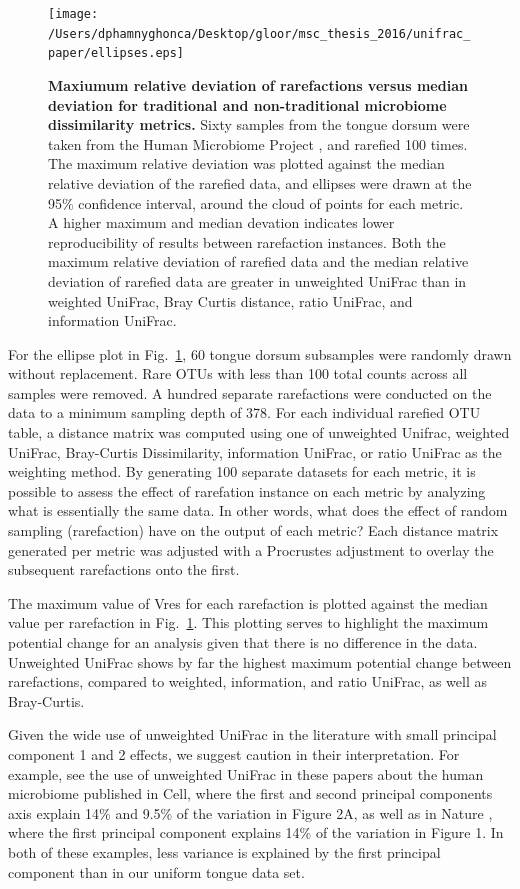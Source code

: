 \documentclass[10pt,letterpaper]{article}
\begin{document}
\begin{figure}[h]
\texttt{[image: /Users/dphamnyghonca/Desktop/gloor/msc\_thesis\_2016/unifrac\_paper/ellipses.eps]}
\caption{{\bf Maxiumum relative deviation of rarefactions versus median deviation for traditional and non-traditional microbiome dissimilarity metrics.} Sixty samples from the tongue dorsum were taken from the Human Microbiome Project \cite{turnbaugh2007human}, and rarefied 100 times. The maximum relative deviation was plotted against the median relative deviation of the rarefied data, and ellipses were drawn at the 95\% confidence interval, around the cloud of points for each metric. A higher maximum and median devation indicates lower reproducibility of results between rarefaction instances. Both the maximum relative deviation of rarefied data and the median relative deviation of rarefied data are greater in unweighted UniFrac than in weighted UniFrac, Bray Curtis distance, ratio UniFrac, and information UniFrac.}
\label{fig3}
\end{figure}

For the ellipse plot in Fig.~\ref{fig3}, 60 tongue dorsum subsamples were randomly drawn without replacement. Rare OTUs with less than 100 total counts across all samples were removed. A hundred separate rarefactions were conducted on the data to a minimum sampling depth of 378. For each individual rarefied OTU table, a distance matrix was computed using one of unweighted Unifrac, weighted UniFrac, Bray-Curtis Dissimilarity, information UniFrac, or ratio UniFrac as the weighting method. By generating 100 separate datasets for each metric, it is possible to assess the effect of rarefation instance on each metric by analyzing what is essentially the same data. In other words, what does the effect of random sampling (rarefaction) have on the output of each metric? Each distance matrix generated per metric was adjusted with a Procrustes adjustment to overlay the subsequent rarefactions onto the first.

The maximum value of Vres for each rarefaction is plotted against the median value per rarefaction in Fig.~\ref{fig3}. This plotting serves to highlight the maximum potential change for an analysis given that there is no difference in the data. Unweighted UniFrac shows by far the highest maximum potential change between rarefactions, compared to weighted, information, and ratio UniFrac, as well as Bray-Curtis.

Given the wide use of unweighted UniFrac in the literature with small principal component 1 and 2 effects, we suggest caution in their interpretation. For example, see the use of unweighted UniFrac in these papers about the human microbiome published in Cell\cite{hsiao2013microbiota}, where the first and second principal components axis explain 14\% and 9.5\% of the variation in Figure 2A, as well as in Nature \cite{sonnenburg2016diet}, where the first principal component explains 14\% of the variation in Figure 1. In both of these examples, less variance is explained by the first principal component than in our uniform tongue data set.
\end{document}
